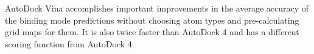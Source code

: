 AutoDock Vina accomplishes important improvements in the average accuracy of the binding mode predictions without choosing atom types and pre-calculating grid maps for them. It is also twice faster than AutoDock 4 and has a different scoring function from AutoDock 4.